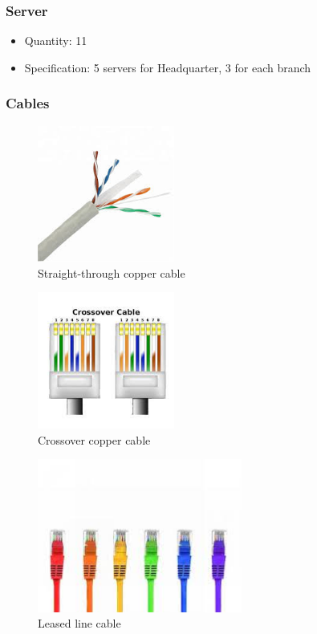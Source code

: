 \subsubsection{Server}
\begin{itemize}
    \item Quantity: 11
    \item Specification: 5 servers for Headquarter, 3 for each branch
\end{itemize}

\subsubsection{Cables}
\begin{figure}[H]
    \centering
    \includegraphics[width=0.4\textwidth]{./assets/copper.png}
    \caption{Straight-through copper cable}
\end{figure}

\begin{figure}[H]
    \centering
    \includegraphics[width=0.4\textwidth]{./assets/crossover.png}
    \caption{Crossover copper cable}
\end{figure}

\begin{figure}[H]
    \centering
    \includegraphics[width=0.6\textwidth]{./assets/lease.png}
    \caption{Leased line cable}
\end{figure}

